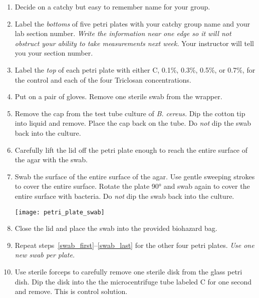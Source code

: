 \documentclass[12pt]{exam}
\begin{document}
\begin{questions}
	\begin{enumerate}
	
		\item Decide on a catchy but easy to remember name for your group. 
	
		\item Label the \emph{bottoms} of five petri plates with your catchy group name and your lab section number. \emph{Write the information near one edge so it will not obstruct your ability to take measurements next week.} Your instructor will tell you your section number.
		
		\item Label the \emph{top} of each petri plate with either C, 0.1\%, 0.3\%, 0.5\%, or 0.7\%, for the control and each of the four Triclosan concentrations. 
		
		\item Put on a pair of gloves. \label{swab_first} Remove one sterile swab from the wrapper. 
		
		\item Remove the cap from the test tube culture of \textit{B. cereus.} Dip the cotton tip into liquid and remove. Place the cap back on the tube. Do \emph{not} dip the swab back into the culture.
		
		\item Carefully lift the lid off the petri plate enough to reach the entire surface of the agar with the swab.
		
		\item Swab the surface of the entire surface of the agar. Use gentle sweeping strokes to cover the entire surface. Rotate the plate 90° and swab again to cover the entire surface with bacteria. Do \emph{not} dip the swab back into the culture.
		
		{\centering\texttt{[image: petri\_plate\_swab]}\par
		}
		
		\item \label{swab_last} Close the lid and place the swab into the provided biohazard bag.
		
		\item Repeat steps~\ref{swab_first}–\ref{swab_last} for the other four petri plates. \emph{Use one new swab per plate.}
		
		\item \label{disk_first} Use sterile forceps to carefully remove one sterile disk from the glass petri dish. Dip the disk into the the microcentrifuge tube labeled C for one second and remove. This is control solution.
		

\end{enumerate}
\end{questions}
\end{document}
